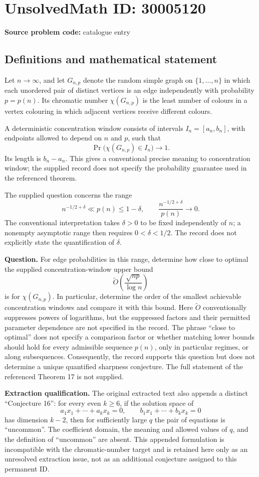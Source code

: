 \documentclass[11pt]{article}
\begin{document}
\section*{UnsolvedMath ID: 30005120}
\textbf{Source problem code:} catalogue entry
\subsection{Definitions and mathematical statement}
Let \(n\to\infty\), and let \(G_{n,p}\) denote the random simple graph on \(\{1,\ldots,n\}\) in which each unordered pair of distinct vertices is an edge independently with probability \(p=p(n)\). Its chromatic number \(\chi(G_{n,p})\) is the least number of colours in a vertex colouring in which adjacent vertices receive different colours.

A deterministic concentration window consists of intervals \(I_n=[a_n,b_n]\), with endpoints allowed to depend on \(n\) and \(p\), such that
\[
\Pr\bigl(\chi(G_{n,p})\in I_n\bigr)\longrightarrow 1.
\]
Its length is \(b_n-a_n\). This gives a conventional precise meaning to concentration window; the supplied record does not specify the probability guarantee used in the referenced theorem.

The supplied question concerns the range
\[
n^{-1/2+\delta}\ll p(n)\leq 1-\delta,
\qquad
\frac{n^{-1/2+\delta}}{p(n)}\longrightarrow 0.
\]
The conventional interpretation takes \(\delta>0\) to be fixed independently of \(n\); a nonempty asymptotic range then requires \(0<\delta<1/2\). The record does not explicitly state the quantification of \(\delta\).

\textbf{Question.} For edge probabilities in this range, determine how close to optimal the supplied concentration-window upper bound
\[
\widetilde O\!\left(\frac{\sqrt{np}}{\log n}\right)
\]
is for \(\chi(G_{n,p})\). In particular, determine the order of the smallest achievable concentration windows and compare it with this bound. Here \(\widetilde O\) conventionally suppresses powers of logarithms, but the suppressed factors and their permitted parameter dependence are not specified in the record. The phrase ``close to optimal'' does not specify a comparison factor or whether matching lower bounds should hold for every admissible sequence \(p(n)\), only in particular regimes, or along subsequences. Consequently, the record supports this question but does not determine a unique quantified sharpness conjecture. The full statement of the referenced Theorem 17 is not supplied.

\textbf{Extraction qualification.} The original extracted text also appends a distinct ``Conjecture 16'': for every even \(k\geq 6\), if the solution space of
\[
a_1x_1+\cdots+a_kx_k=0,
\qquad
b_1x_1+\cdots+b_kx_k=0
\]
has dimension \(k-2\), then for sufficiently large \(q\) the pair of equations is ``uncommon''. The coefficient domain, the meaning and allowed values of \(q\), and the definition of ``uncommon'' are absent. This appended formulation is incompatible with the chromatic-number target and is retained here only as an unresolved extraction issue, not as an additional conjecture assigned to this permanent ID.
\end{document}
